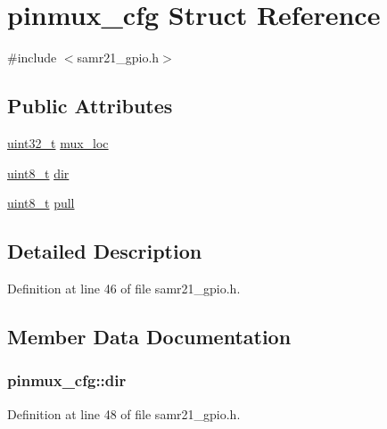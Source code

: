 \hypertarget{structpinmux__cfg}{}\section{pinmux\+\_\+cfg Struct Reference}
\label{structpinmux__cfg}


{\ttfamily \#include $<$samr21\+\_\+gpio.\+h$>$}

\subsection*{Public Attributes}
\begin{DoxyCompactItemize}
\item 
\hyperlink{_p_e___types_8h_a33594304e786b158f3fb30289278f5af}{uint32\+\_\+t} \hyperlink{structpinmux__cfg_a57d9b76a08ffc0f59967a83cede8dce9}{mux\+\_\+loc}
\item 
\hyperlink{_p_e___types_8h_aba7bc1797add20fe3efdf37ced1182c5}{uint8\+\_\+t} \hyperlink{structpinmux__cfg_ab2165b7a82bce36472b0562944500811}{dir}
\item 
\hyperlink{_p_e___types_8h_aba7bc1797add20fe3efdf37ced1182c5}{uint8\+\_\+t} \hyperlink{structpinmux__cfg_ae653ebc3ee0ea56b5eb553a4f9ac19f9}{pull}
\end{DoxyCompactItemize}


\subsection{Detailed Description}


Definition at line 46 of file samr21\+\_\+gpio.\+h.



\subsection{Member Data Documentation}
\subsubsection[{\texorpdfstring{dir}{dir}}]{ pinmux\+\_\+cfg\+::dir}\hypertarget{structpinmux__cfg_ab2165b7a82bce36472b0562944500811}{}\label{structpinmux__cfg_ab2165b7a82bce36472b0562944500811}


Definition at line 48 of file samr21\+\_\+gpio.\+h.

